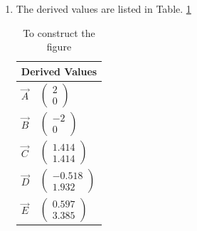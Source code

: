 \begin{enumerate}[label=\thesection.\arabic*.,ref=\thesection.\theenumi]
\item The derived values are listed in 
Table. \ref{table:table2} 
\begin{table}[ht!]
\centering
\begin{tabular}{ |p{2cm}|p{4cm}|  }
\hline
 \multicolumn{2}{|c|}{Derived Values} \\
\hline \centering
$\vec{A}$ & $\begin{pmatrix}2\\0\end{pmatrix}$\\
\hline \centering
$\vec{B}$ & $\begin{pmatrix}-2\\0\end{pmatrix}$\\
\hline \centering
$\vec{C}$ & $\begin{pmatrix}1.414\\1.414\end{pmatrix}$\\
\hline \centering
$\vec{D}$ & $\begin{pmatrix}-0.518\\1.932\end{pmatrix}$\\
\hline \centering
$\vec{E}$ & $\begin{pmatrix}0.597\\3.385\end{pmatrix}$\\
\hline

\end{tabular}
\caption{To construct the figure}
\label{table:table2}
\end{table}



\end{enumerate}
